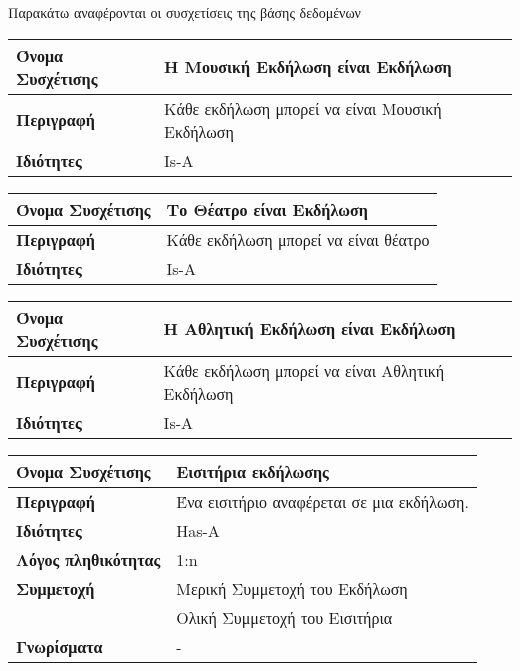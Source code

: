 Παρακάτω αναφέρονται οι συσχετίσεις της βάσης δεδομένων \titlos
\begin{center}
\begin{tabular}[]{|p{4cm}|p{10cm}|}
  \hline
  \textbf{Όνομα Συσχέτισης} & Η Μουσική Εκδήλωση είναι Εκδήλωση\\ \hline
  \textbf{Περιγραφή} & Κάθε εκδήλωση μπορεί να είναι Μουσική Εκδήλωση\\ \hline
  \textbf{Ιδιότητες} & Is-A  \\ \hline
\end{tabular}
\vspace{0.3 cm}

\begin{tabular}[]{|p{4cm}|p{10cm}|}
  \hline
  \textbf{Όνομα Συσχέτισης} & Το Θέατρο είναι Εκδήλωση\\ \hline
  \textbf{Περιγραφή} & Κάθε εκδήλωση μπορεί να είναι θέατρο\\ \hline
  \textbf{Ιδιότητες} & Is-A  \\ \hline
\end{tabular}
\vspace{0.3 cm}

\begin{tabular}[]{|p{4cm}|p{10cm}|}
  \hline
  \textbf{Όνομα Συσχέτισης} & Η Αθλητική Εκδήλωση είναι Εκδήλωση\\ \hline
  \textbf{Περιγραφή} & Κάθε εκδήλωση μπορεί να είναι Αθλητική Εκδήλωση\\ \hline
  \textbf{Ιδιότητες} & Is-A  \\ \hline
\end{tabular}
\vspace{0.3 cm}


\begin{tabular}[]{|p{4cm}|p{10cm}|}
  \hline
  \textbf{Όνομα Συσχέτισης}   & Εισιτήρια εκδήλωσης                       \\ \hline
  \textbf{Περιγραφή}          & Ένα εισιτήριο αναφέρεται σε μια εκδήλωση. \\ \hline
  \textbf{Ιδιότητες}          & Has-A                                     \\ \hline
  \textbf{Λόγος πληθικότητας} & 1:n                                       \\ \hline
  \textbf{Συμμετοχή}          & Μερική Συμμετοχή του Εκδήλωση             \\ \cline{2-2}
                              & Ολική Συμμετοχή του Εισιτήρια             \\ \hline
  \textbf{Γνωρίσματα}         & -                                         \\ \hline
\end{tabular}
\vspace{0.3 cm}


\end{center}
